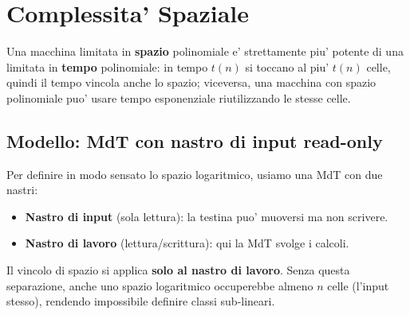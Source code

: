 % 
\chapter{Complessita' Spaziale}

Una macchina limitata in \textbf{spazio} polinomiale e' strettamente piu' potente di una limitata in \textbf{tempo} polinomiale: in tempo $t(n)$ si toccano al piu' $t(n)$ celle, quindi il tempo vincola anche lo spazio; viceversa, una macchina con spazio polinomiale puo' usare tempo esponenziale riutilizzando le stesse celle.

\section{Modello: MdT con nastro di input read-only}

Per definire in modo sensato lo spazio logaritmico, usiamo una MdT con due nastri:
\begin{itemize}
  \item \textbf{Nastro di input} (sola lettura): la testina puo' muoversi ma non scrivere.
  \item \textbf{Nastro di lavoro} (lettura/scrittura): qui la MdT svolge i calcoli.
\end{itemize}

Il vincolo di spazio si applica \textbf{solo al nastro di lavoro}. Senza questa separazione, anche uno spazio logaritmico occuperebbe almeno $n$ celle (l'input stesso), rendendo impossibile definire classi sub-lineari.





